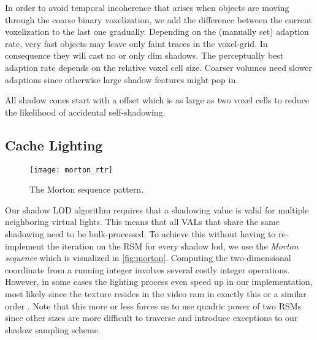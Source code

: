 \documentclass[thesis.tex]{subfiles}
\begin{document}
In order to avoid temporal incoherence that arises when objects are moving through the coarse binary voxelization, we add the difference between the current voxelization to the last one gradually.
Depending on the (manually set) adaption rate, very fast objects may leave only faint traces in the voxel-grid.
In consequence they will cast no or only dim shadows.
The perceptually best adaption rate depends on the relative voxel cell size.
Coarser volumes need slower adaptions since otherwise large shadow features might pop in.


All shadow cones start with a offset which is as large as two voxel cells to reduce the likelihood of accidental self-shadowing. 

\subsection{Cache Lighting} \label{sec:impl:details:lighting}
\begin{figure}[h]
\centering
\texttt{[image: morton\_rtr]}
\caption{\cite[p.848]{bib:RealtimeRenderingBook} The Morton sequence pattern. } \label{fig:morton}
\end{figure}
Our shadow LOD algorithm requires that a shadowing value is valid for multiple neighboring virtual lights.
This means that all VALs that share the same shadowing need to be bulk-processed.
To achieve this without having to re-implement the iteration on the RSM for every shadow lod, we use the \emph{Morton sequence} \cite{bib:mortonorder} which is visualized in \autoref{fig:morton}.
Computing the two-dimensional coordinate from a running integer involves several costly integer operations.
However, in some cases the lighting process even speed up in our implementation, most likely since the texture resides in the video ram in exactly this or a similar order \cite[p.848]{bib:RealtimeRenderingBook}.
Note that this more or less forces us to use quadric power of two RSMs since other sizes are more difficult to traverse and introduce exceptions to our shadow sampling scheme.
\end{document}

